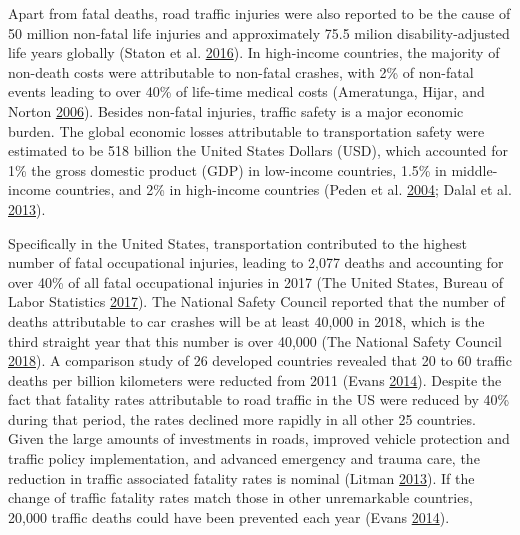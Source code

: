 \documentclass[12pt]{book}
\numberwithin{equation}{chapter}
\begin{document}
Apart from fatal deaths, road traffic injuries were also reported to be the cause of 50 million non-fatal life injuries and approximately 75.5 milion disability-adjusted life years globally (Staton et al. \protect\hyperlink{ref-staton2016road}{2016}).
In high-income countries, the majority of non-death costs were attributable to non-fatal crashes, with 2\% of non-fatal events leading to over 40\% of life-time medical costs (Ameratunga, Hijar, and Norton \protect\hyperlink{ref-ameratunga2006road}{2006}).
Besides non-fatal injuries, traffic safety is a major economic burden.
The global economic losses attributable to transportation safety were estimated to be 518 billion the United States Dollars (USD), which accounted for 1\% the gross domestic product (GDP) in low-income countries, 1.5\% in middle-income countries, and 2\% in high-income countries (Peden et al. \protect\hyperlink{ref-peden2004world}{2004}; Dalal et al. \protect\hyperlink{ref-dalal2013economics}{2013}).

Specifically in the United States, transportation contributed to the highest number of fatal occupational injuries, leading to 2,077 deaths and accounting for over 40\% of all fatal occupational injuries in 2017 (The United States, Bureau of Labor Statistics \protect\hyperlink{ref-bols}{2017}).
The National Safety Council reported that the number of deaths attributable to car crashes will be at least 40,000 in 2018, which is the third straight year that this number is over 40,000 (The National Safety Council \protect\hyperlink{ref-nsc2018}{2018}).
A comparison study of 26 developed countries revealed that 20 to 60 traffic deaths per billion kilometers were reducted from 2011 (Evans \protect\hyperlink{ref-evans2014traffic}{2014}).
Despite the fact that fatality rates attributable to road traffic in the US were reduced by 40\% during that period, the rates declined more rapidly in all other 25 countries.
Given the large amounts of investments in roads, improved vehicle protection and traffic policy implementation, and advanced emergency and trauma care, the reduction in traffic associated fatality rates is nominal (Litman \protect\hyperlink{ref-litman2013transportation}{2013}).
If the change of traffic fatality rates match those in other unremarkable countries, 20,000 traffic deaths could have been prevented each year (Evans \protect\hyperlink{ref-evans2014traffic}{2014}).
\end{document}
